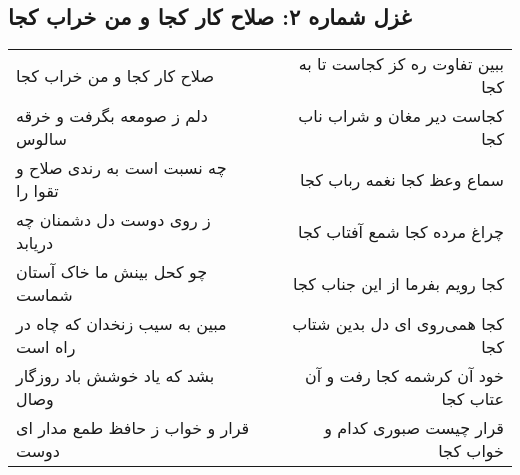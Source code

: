 \begin{center}
\section*{غزل شماره ۲: صلاح کار کجا و من خراب کجا}
\label{sec:sh002}
\begin{longtable}{l p{0.5cm} r}
صلاح کار کجا و من خراب کجا
&&
ببین تفاوت ره کز کجاست تا به کجا
\\
دلم ز صومعه بگرفت و خرقه سالوس
&&
کجاست دیر مغان و شراب ناب کجا
\\
چه نسبت است به رندی صلاح و تقوا را
&&
سماع وعظ کجا نغمه رباب کجا
\\
ز روی دوست دل دشمنان چه دریابد
&&
چراغ مرده کجا شمع آفتاب کجا
\\
چو کحل بینش ما خاک آستان شماست
&&
کجا رویم بفرما از این جناب کجا
\\
مبین به سیب زنخدان که چاه در راه است
&&
کجا همی‌روی ای دل بدین شتاب کجا
\\
بشد که یاد خوشش باد روزگار وصال
&&
خود آن کرشمه کجا رفت و آن عتاب کجا
\\
قرار و خواب ز حافظ طمع مدار ای دوست
&&
قرار چیست صبوری کدام و خواب کجا
\\
\end{longtable}
\end{center}
